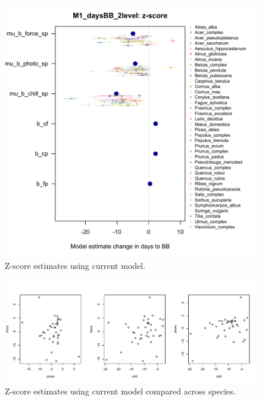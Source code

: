 \documentclass[11pt,letterpaper]{article}
\begin{document}

\newpage




\begin{figure}[t!]
\centering
\includegraphics[width=1\textwidth]{..//..//analyses/bb_analysis/figures/M1winterZ_params_wcolor.pdf}
\caption{Z-score estimates using current model.}
  \label{fig:zscore}
\end{figure}
\clearpage


\begin{figure}[t!]
\centering
\includegraphics[width=1\textwidth]{..//..//analyses/bb_analysis/figures/M1winterZ_params_compspp.pdf}
\caption{Z-score estimates using current model compared across species.}
  \label{fig:sppcomp}
\end{figure}
\clearpage
\end{document}
